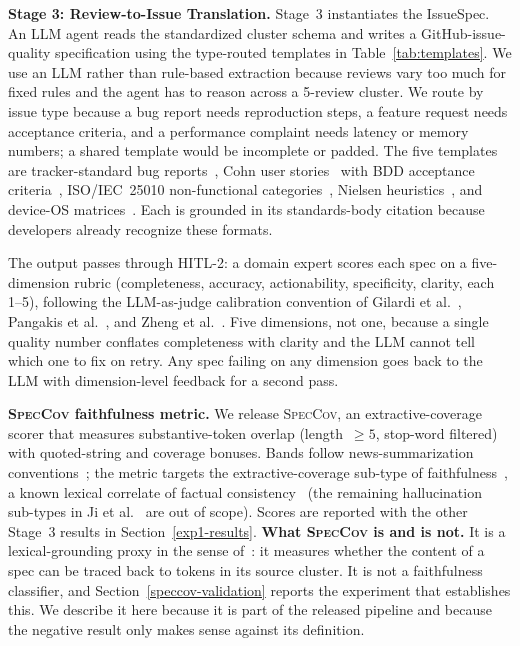 \documentclass[preprint,12pt]{elsarticle}
\begin{document}
  \textbf{Stage 3: Review-to-Issue Translation.} Stage~3 instantiates
  the IssueSpec. An LLM agent reads the standardized cluster schema and
  writes a GitHub-issue-quality specification using the type-routed
  templates in Table~\ref{tab:templates}. We use an LLM rather than
  rule-based extraction because reviews vary too much for fixed rules
  and the agent has to reason across a 5-review cluster. We route by
  issue type because a bug report needs reproduction steps, a feature
  request needs acceptance criteria, and a performance complaint needs
  latency or memory numbers; a shared template would be incomplete or
  padded. The five templates are tracker-standard bug
  reports~\cite{zimmermann2010makes}, Cohn user stories~\cite{cohn2004user}
  with BDD acceptance criteria~\cite{hellesoy2017cucumber}, ISO/IEC~25010
  non-functional categories~\cite{international2011systems}, Nielsen
  heuristics~\cite{nielsen1994usability}, and device-OS
  matrices~\cite{joorabchi2013real}. Each is grounded in its
  standards-body citation because developers already recognize these
  formats.
  
  The output passes through HITL-2: a domain expert scores each spec on
  a five-dimension rubric (completeness, accuracy, actionability,
  specificity, clarity, each 1--5), following the LLM-as-judge
  calibration convention of Gilardi et al.~\cite{gilardi2023chatgpt},
  Pangakis et al.~\cite{pangakis2023automated}, and Zheng et
  al.~\cite{zheng2023judging}. Five dimensions, not one, because a
  single quality number conflates completeness with clarity and the LLM
  cannot tell which one to fix on retry. Any spec failing on any
  dimension goes back to the LLM with dimension-level feedback for a
  second pass.


\textbf{\textsc{SpecCov} faithfulness metric.} We release \textsc{SpecCov}, an extractive-coverage scorer that measures substantive-token overlap (length~$\geq 5$, stop-word filtered) with quoted-string and coverage bonuses. Bands follow news-summarization conventions~\cite{grusky2018newsroom}; the metric targets the extractive-coverage sub-type of faithfulness~\cite{grusky2018newsroom, maynez2020faithfulness}, a known lexical correlate of factual consistency~\cite{kryscinski2020evaluating} (the remaining hallucination sub-types in Ji et al.~\cite{ji2023survey} are out of scope). Scores are reported with the other Stage~3 results in Section~\ref{exp1-results}.
\textbf{What \textsc{SpecCov} is and is not.} It is a lexical-grounding proxy in the sense
of~\cite{grusky2018newsroom}: it measures whether the content of a spec can be traced back to
tokens in its source cluster. It is not a faithfulness classifier, and Section~\ref{speccov-validation}
reports the experiment that establishes this. We describe it here because it is part of the
released pipeline and because the negative result only makes sense against its definition.
\end{document}
